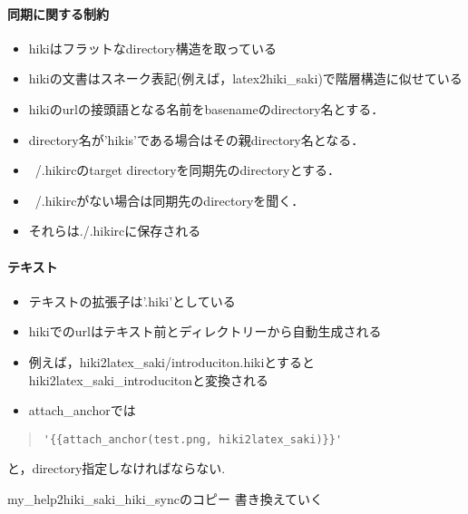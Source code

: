 \paragraph{同期に関する制約}
\begin{itemize}
\item hikiはフラットなdirectory構造を取っている
\item hikiの文書はスネーク表記(例えば，latex2hiki\_saki)で階層構造に似せている
\item hikiのurlの接頭語となる名前をbasenameのdirectory名とする．
\item directory名が'hikis'である場合はその親directory名となる．
\item ~/.hikircのtarget directoryを同期先のdirectoryとする．
\item ~/.hikircがない場合は同期先のdirectoryを聞く．
\item それらは./.hikircに保存される
\end{itemize}
\paragraph{テキスト}
\begin{itemize}
\item テキストの拡張子は'.hiki'としている
\item hikiでのurlはテキスト前とディレクトリーから自動生成される
\item 例えば，hiki2latex\_saki/introduciton.hikiとするとhiki2latex\_saki\_introducitonと変換される
\item attach\_anchorでは
\end{itemize}\begin{quote}\begin{verbatim}
'{{attach_anchor(test.png, hiki2latex_saki)}}'
\end{verbatim}\end{quote}
と，directory指定しなければならない.

my\_help2hiki\_saki\_hiki\_syncのコピー
書き換えていく

